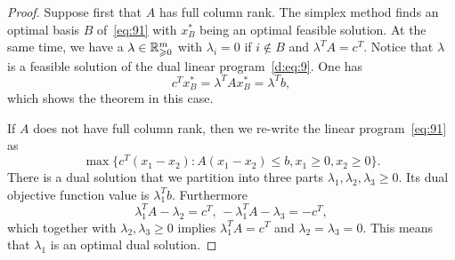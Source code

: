 \begin{proof}
  Suppose first that $A$ has full column rank.  The simplex method
  finds an optimal basis $B$ of~\eqref{eq:91} with $x^*_B$ being an
  optimal feasible solution. At the same time, we have a $\lambda \in
  \mathbb{R}_{\geqslant 0}^m$ with $\lambda_i = 0$ if $i \notin B$ and $\lambda^TA
  = c^T$. Notice that $\lambda$ is  a feasible solution of the dual linear program~\eqref{d:eq:9}. One has 
  \begin{displaymath}
    c^T x^*_B = \lambda^T A x_B^* = \lambda^T b,
  \end{displaymath}
  which shows the theorem in this case. 

  If $A$ does not have full column rank, then we re-write the linear
  program~\eqref{eq:91} as
  \begin{equation}
    \label{eq:d-1}
    \max\{ c^T (x_1 - x_2) \colon A(x_1-x_2) \leq b, x_1\geq 0, x_2 \geq 0\}.  
  \end{equation}
  There is a dual solution that we partition into three parts
  $\lambda_1,\lambda_2,\lambda_3 \geq 0$. Its dual objective function
  value is $\lambda_1^Tb$. Furthermore 
  \begin{displaymath}
    \lambda_1^TA - \lambda_2 = c^T, \, - \lambda_1^TA - \lambda_3 = -c^T,
  \end{displaymath}
  which together with $\lambda_2,\lambda_3 \geq 0$ implies $
  \lambda_1^TA = c^T$ and $\lambda_2=\lambda_3=0$. This means that $\lambda_1$ is an optimal dual solution. 

\end{proof}


